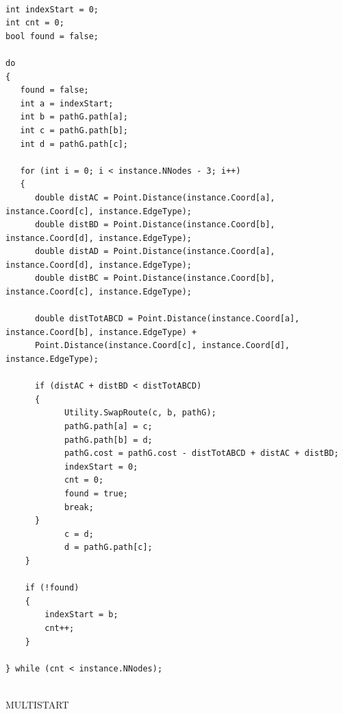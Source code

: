 \documentclass[11pt]{article}
\begin{document}
\begin{lstlisting}

int indexStart = 0;
int cnt = 0;
bool found = false;

do
{
   found = false;
   int a = indexStart;
   int b = pathG.path[a];
   int c = pathG.path[b];
   int d = pathG.path[c];

   for (int i = 0; i < instance.NNodes - 3; i++)
   {
      double distAC = Point.Distance(instance.Coord[a], instance.Coord[c], instance.EdgeType);
      double distBD = Point.Distance(instance.Coord[b], instance.Coord[d], instance.EdgeType);
      double distAD = Point.Distance(instance.Coord[a], instance.Coord[d], instance.EdgeType);
      double distBC = Point.Distance(instance.Coord[b], instance.Coord[c], instance.EdgeType);

      double distTotABCD = Point.Distance(instance.Coord[a], instance.Coord[b], instance.EdgeType) +
      Point.Distance(instance.Coord[c], instance.Coord[d], instance.EdgeType);

      if (distAC + distBD < distTotABCD)
      {
            Utility.SwapRoute(c, b, pathG);
            pathG.path[a] = c;
            pathG.path[b] = d;
            pathG.cost = pathG.cost - distTotABCD + distAC + distBD;
            indexStart = 0;
            cnt = 0;
            found = true;
            break;
      }
            c = d;
            d = pathG.path[c];
    }

    if (!found)
    {
        indexStart = b;
        cnt++;
    }

} while (cnt < instance.NNodes);
    

\end{lstlisting}


\vspace{2\baselineskip}
MULTISTART
\vspace{2\baselineskip}
 
\end{document}
